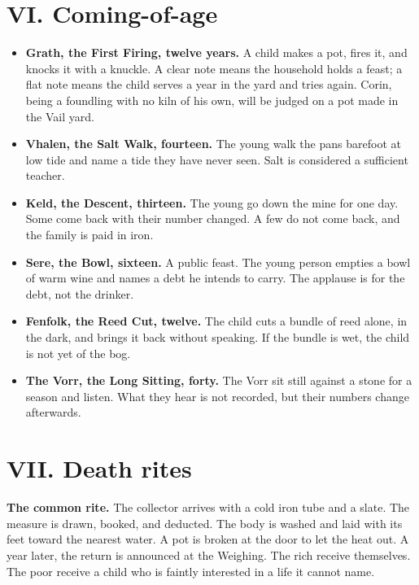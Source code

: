 \documentclass{design/chronicle}
\begin{document}
\CRrule

\section*{VI. Coming-of-age}

\begin{itemize}[leftmargin=1.4em,itemsep=1pt,topsep=3pt,parsep=0pt]

\item \textbf{Grath, the First Firing, twelve years.} A child makes a pot, fires it, and knocks it with a knuckle. A clear note means the household holds a feast; a flat note means the child serves a year in the yard and tries again. Corin, being a foundling with no kiln of his own, will be judged on a pot made in the Vail yard.

\item \textbf{Vhalen, the Salt Walk, fourteen.} The young walk the pans barefoot at low tide and name a tide they have never seen. Salt is considered a sufficient teacher.

\item \textbf{Keld, the Descent, thirteen.} The young go down the mine for one day. Some come back with their number changed. A few do not come back, and the family is paid in iron.

\item \textbf{Sere, the Bowl, sixteen.} A public feast. The young person empties a bowl of warm wine and names a debt he intends to carry. The applause is for the debt, not the drinker.

\item \textbf{Fenfolk, the Reed Cut, twelve.} The child cuts a bundle of reed alone, in the dark, and brings it back without speaking. If the bundle is wet, the child is not yet of the bog.

\item \textbf{The Vorr, the Long Sitting, forty.} The Vorr sit still against a stone for a season and listen. What they hear is not recorded, but their numbers change afterwards.

\end{itemize}

\CRrule

\section*{VII. Death rites}

\textbf{The common rite.} The collector arrives with a cold iron tube and a slate. The measure is drawn, booked, and deducted. The body is washed and laid with its feet toward the nearest water. A pot is broken at the door to let the heat out. A year later, the return is announced at the Weighing. The rich receive themselves. The poor receive a child who is faintly interested in a life it cannot name.
\end{document}
